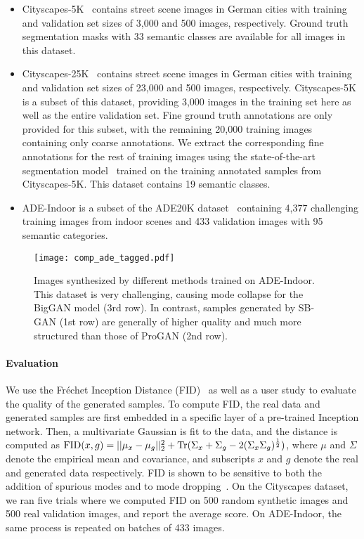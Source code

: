 \documentclass[10pt,twocolumn,letterpaper]{article}
\DeclareMathOperator{\Tr}{Tr}
\begin{document}
\begin{itemize}[itemsep=0pt,topsep=1pt]
    \item Cityscapes-5K~\cite{cityscapes} contains street scene images in German cities with training and validation set sizes of 3,000 and 500 images, respectively. Ground truth segmentation masks with 33 semantic classes are available for all images in this dataset.
    \item Cityscapes-25K~\cite{cityscapes} contains street scene images in German cities with training and validation set sizes of 23,000 and 500 images, respectively. Cityscapes-5K is a subset of this dataset, providing 3,000 images in the training set here as well as the entire validation set. Fine ground truth annotations are only provided for this subset, with the remaining 20,000 training images containing only coarse annotations.
    We extract the corresponding fine annotations for the rest of training images using the state-of-the-art segmentation model~\cite{DRN, Yu2016} trained on the training annotated samples from Cityscapes-5K. This dataset contains 19 semantic classes. 
    \item ADE-Indoor is a subset of the ADE20K dataset~\cite{ADE20k} containing 4,377 challenging training images from indoor scenes and 433 validation images with 95 semantic categories. 
\end{itemize}

\begin{figure*}
\centering
\texttt{[image: comp\_ade\_tagged.pdf]}
\caption{Images synthesized by different methods trained on ADE-Indoor. This dataset is very challenging, causing mode collapse for the BigGAN model (3rd row). In contrast, samples generated by SB-GAN (1st row) are generally of higher quality and much more structured than those of ProGAN (2nd row).}
\label{fig:ade}
\end{figure*}

\vspace{-3mm}
\paragraph{Evaluation} We use the Fr{\'e}chet Inception Distance (FID)~\cite{heusel2017gans} as well as a user study to evaluate the quality of the generated samples. To compute FID, the real data and generated samples are first embedded in a specific layer of a pre-trained Inception network. Then, a multivariate Gaussian is fit to the data, and the distance is computed as
$\FID(x, g) = ||\mu_x -\mu_g||_2^2 + \Tr(\Sigma_x + \Sigma_g - 2(\Sigma_x\Sigma_g)^\frac12)$,
where $\mu$ and $\Sigma$ denote the empirical mean and covariance, and subscripts $x$ and $g$ denote the real and generated data respectively. FID is shown to be sensitive to both the addition of spurious modes and to mode dropping~\cite{sajjadi2018assessing,lucic2018}. On the Cityscapes dataset, we ran five trials where we computed FID on 500 random synthetic images and 500 real validation images, and report the average score. On ADE-Indoor, the same process is repeated on batches of 433 images.  
\end{document}
